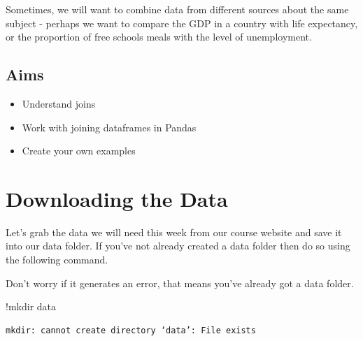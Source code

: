 \documentclass[
  letterpaper,
  DIV=11,
  numbers=noendperiod]{scrreprt}
\newenvironment{Shaded}{\begin{snugshade}}{\end{snugshade}}
\newcommand{\NormalTok}[1]{\textcolor[rgb]{0.00,0.23,0.31}{#1}}
\newcommand{\OperatorTok}[1]{\textcolor[rgb]{0.37,0.37,0.37}{#1}}
\providecommand{\tightlist}{%
  \setlength{\itemsep}{0pt}\setlength{\parskip}{0pt}}\usepackage{longtable,booktabs,array}
\begin{document}
Sometimes, we will want to combine data from different sources about the
same subject - perhaps we want to compare the GDP in a country with life
expectancy, or the proportion of free schools meals with the level of
unemployment.

\hypertarget{aims-3}{%
\subsection{Aims}\label{aims-3}}

\begin{itemize}
\tightlist
\item
  Understand joins
\item
  Work with joining dataframes in Pandas
\item
  Create your own examples
\end{itemize}

\hypertarget{downloading-the-data-2}{%
\section{Downloading the Data}\label{downloading-the-data-2}}

Let's grab the data we will need this week from our course website and
save it into our data folder. If you've not already created a data
folder then do so using the following command.

Don't worry if it generates an error, that means you've already got a
data folder.

\begin{Shaded}
\begin{Highlighting}[]
\OperatorTok{!}\NormalTok{mkdir data}
\end{Highlighting}
\end{Shaded}

\begin{verbatim}
mkdir: cannot create directory ‘data’: File exists
\end{verbatim}
\end{document}
